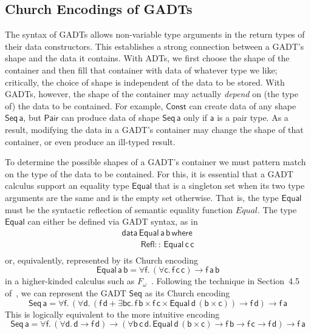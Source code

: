 \documentclass[submission,copyright,creativecommons]{eptcs}
\begin{document}
\subsection{Church Encodings of GADTs}\label{sec:CEs}

The syntax of GADTs allows non-variable type arguments in the return
types of their data constructors. This establishes a strong connection
between a GADT's shape and the data it contains. With ADTs, we first
choose the shape of the container and then fill that container with
data of whatever type we like; critically, the choice of shape is
independent of the data to be stored. With GADTs, however, the shape
of the container may actually {\em depend} on (the type of) the data
to be contained. For example, $\mathsf{Const}$ can create data of any
shape $\mathsf{Seq\,a}$, but $\mathsf{Pair}$ can produce data of shape
$\mathsf{Seq\,a}$ only if $\mathsf{a}$ is a pair type. As a result,
modifying the data in a GADT's container may change the shape of that
container, or even produce an ill-typed result.

To determine the possible shapes of a GADT's container we must
pattern match on the type of the data to be contained. For this, it is
essential that a GADT calculus support an equality type
$\mathsf{Equal}$ that is a singleton set when its two type arguments
are the same and is the empty set otherwise. That is, the type
$\mathsf{Equal}$ must be the syntactic reflection of semantic equality
function $\mathit{Equal}$. The type $\mathsf{Equal}$ can either be
defined via GADT syntax, as in
\[\begin{array}{l}
\mathsf{data\, Equal\,a\,b\,where}\\
\mathsf{\;\;\;\;\;\;\;\;Refl ::\, Equal\,c\,c}\\
\end{array}\]
\noindent
or, equivalently, represented by its Church encoding
\[\mathsf{Equal\,a\,b} = \mathsf{\forall f.\, (\forall c.\,
  f\,c\,c) \to f\,a\,b}\] in a higher-kinded calculus such as
$F_\omega$~\cite{atk12}. Following the technique in Section~4.5
of~\cite{atk12}, we can represent the GADT $\mathsf{Seq}$ as its
Church encoding
\[\mathsf{Seq\,a} = \mathsf{\forall f.\,(\forall d. \,(f\,d + \exists b
  c.\, f\, b \times f \,c \times \mathsf{Equal}\, d \,(b \times c))
  \to f \,d) \to f\, a}\]
This is logically equivalent to the more intuitive encoding
\[\mathsf{Seq\,a} = \mathsf{\forall f.\, (\forall d.\,d \to f\, d)
  \to (\forall b\,c\,d.\,Equal\,d\,(b\times c) \to f\,b \to f\,c \to
  f\,d) \to f\,a}\]
\end{document}
